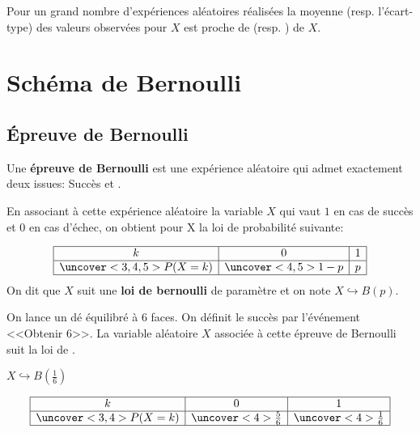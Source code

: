 \documentclass{beamer}
\begin{document}
     \begin{frame}
   \begin{theorem}
    
    Pour un grand nombre d'expériences aléatoires réalisées la moyenne (resp. l'écart-type)
    des valeurs observées pour $X$ est proche de  
    (resp. ) de $X$.
    
   \end{theorem}
   \end{frame}
   
 
   
    \section{Schéma de Bernoulli}
  \subsection{\'Epreuve de Bernoulli}
  \begin{frame}
  \begin{definition}
    Une \textbf{épreuve de Bernoulli} est une expérience aléatoire qui admet exactement deux issues:
    Succès et .
    
    En associant à cette expérience aléatoire la variable $X$ qui vaut $1$ en cas de succès et 
    $0$ en cas d'échec, on obtient pour X la loi de probabilité suivante:
     
     \renewcommand{\arraystretch}{1.5}
 $$
\begin{array}{|c|c|c|}

\hline
    k&0&1\\
    \hline
    \uncover<3,4,5>{P(X=k)}&\uncover<4,5>{1-p}&p\\
    \hline
    \end{array} 
$$   
     On dit que $X$ suit une \textbf{loi de bernoulli} de paramètre  et 
     on note $X \hookrightarrow B(p)$.
  \end{definition}
  \end{frame}
  
  \begin{frame}
   \begin{example}
    On lance un dé équilibré à 6 faces. On définit le succès par l'événement <<Obtenir 6>>.
    La variable aléatoire $X$ associée à cette épreuve de Bernoulli suit la loi de 
    .
    
    $X \hookrightarrow B(\frac{1}{6})$
    
    \renewcommand{\arraystretch}{1.5}
     $$
\begin{array}{|c|c|c|}

\hline
    k&0&1\\
    \hline
    \uncover<3,4>{P(X=k)}&\uncover<4>{\frac{5}{6}}&\uncover<4>{\frac{1}{6}}\\
    \hline
    \end{array} 
$$
  
 \end{example}
 \end{frame}
 
\end{document}
